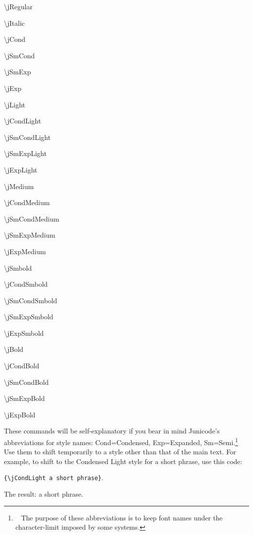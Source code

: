 \begin{multicols}{3}
    \jCond\textbackslash jRegular

    \textbackslash jItalic
    
    \textbackslash jCond
    
    \textbackslash jSmCond
    
    \textbackslash jSmExp
    
    \textbackslash jExp
    
    \textbackslash jLight
    
    \textbackslash jCondLight
    
    \textbackslash jSmCondLight
    
    {\color{BrickRed}\textbackslash jSmExpLight}
    
    {\color{BrickRed}\textbackslash jExpLight}
    
    \textbackslash jMedium
    
    \textbackslash jCondMedium
    
    \textbackslash jSmCondMedium
    
    \textbackslash jSmExpMedium
    
    \textbackslash jExpMedium
    
    \textbackslash jSmbold
    
    {\color{BrickRed}\textbackslash jCondSmbold}
    
    {\color{BrickRed}\textbackslash jSmCondSmbold}
    
    \textbackslash jSmExpSmbold
    
    \textbackslash jExpSmbold
    
    \textbackslash jBold
    
    {\color{BrickRed}\textbackslash jCondBold}
    
    {\color{BrickRed}\textbackslash jSmCondBold}
    
    \textbackslash jSmExpBold
    
    \textbackslash jExpBold
    
\end{multicols}

\noindent These commands will be self-explanatory if you bear in mind Junicode's 
abbreviations for style names: Cond=Condensed, Exp=Expanded, Sm=Semi.\footnote{\ %
The purpose of these abbreviations is to keep font names under the character-limit
imposed by some systems.} Use
them to shift temporarily to a style other than that of the main text.
For example, to shift to the Condensed Light style for a short phrase, use
this code:
\begin{center}
{\color{BrickRed}\small\verb|{\jCondLight a short phrase}|}.
\end{center}
The result: {\jCondLight a short phrase}.

